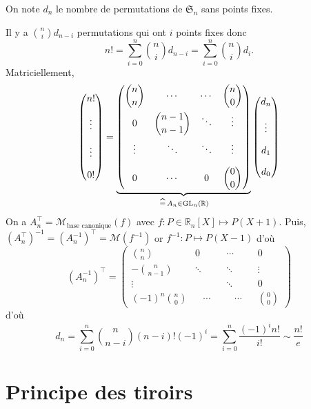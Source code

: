 \begin{ex}
    On note $d_n$ le nombre de permutations de $\mathfrak S_n$ sans points fixes.

    Il y a $\displaystyle \binom ni d_{n-i}$ permutations qui ont $i$ points fixes donc \[
        n!=\sum_{i=0}^n\binom nid_{n-i}=\sum_{i=0}^n\binom nid_i.
    \]
    Matriciellement, \[
        \begin{pmatrix}
            n!\\[1em]
            \vdots\\[1em]
            \vdots\\[1em]
            0!
            \end{pmatrix}= \underbrace{\begin{pmatrix}
        \displaystyle\binom nn & \cdots & \cdots & \displaystyle\binom n0 \\[1em]
        0 & \displaystyle\binom{n-1}{n-1} & \ddots & \vdots \\[1em]
        \vdots & \ddots & \ddots & \vdots \\[1em]
        0 & \cdots & 0 & \displaystyle\binom 00
    \end{pmatrix}}_{\,\widehat=\, A_n\in \mathrm{GL}_n(\mathbb R)} \begin{pmatrix}
        d_n\\[1em]
        \vdots \\[1em]
        d_1\\[1em]
        d_0
        \end{pmatrix}
    \]
    On a $A_n^\top=\mathcal {M}_{\text{base canonique}}(f)$ avec $f:P\in\mathbb R_n[X]\longmapsto P(X+1)$. Puis, $(A_n^\top)^{-1}=(A_n^{-1})^\top=\mathcal M(f^{-1})$ or $f^{-1}:P\longmapsto P(X-1)$ d'où \[
        (A_n^{-1})^\top = \begin{pmatrix}
            \displaystyle\binom nn & 0 & \cdots & 0 \\[1em]
            \displaystyle -\binom n{n-1} & \ddots & \ddots & \vdots \\[1em]
            \vdots &  & \ddots & 0 \\[1em]
            (-1)^n\displaystyle\binom n0 & \;\;\;\cdots\;\;\; & \;\;\;\cdots\;\;\; & \displaystyle\binom 00
        \end{pmatrix}
    \]
    d'où \[
        d_n=\sum_{i=0}^n\binom n{n-i}(n-i)!(-1)^i=\sum_{i=0}^n\frac{(-1)^in!}{i!}\sim \frac{n!}e
    \]
\end{ex}

\section{Principe des tiroirs}

